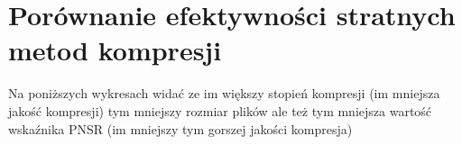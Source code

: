 \documentclass{report}
\begin{document}


\section{Porównanie efektywności stratnych metod kompresji}


Na poniższych wykresach widać ze im większy stopień kompresji 
(im mniejsza jakość kompresji)
tym mniejszy rozmiar plików ale też tym mniejsza wartość wskaźnika PNSR 
(im mniejszy tym gorszej jakości kompresja)





\renewcommand{\ww}{0.16}
\end{document}
